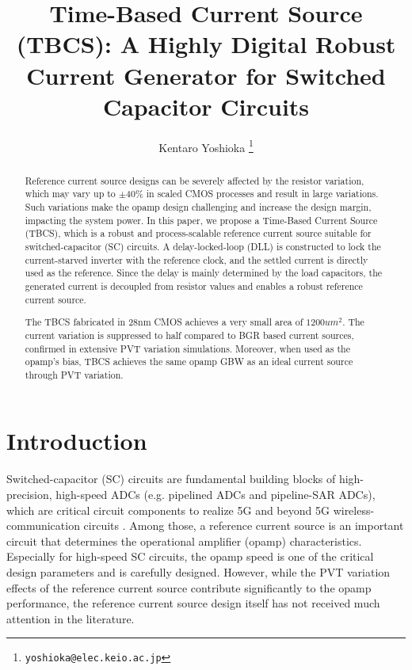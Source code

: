 \documentclass[letterpaper, 10 pt, conference]{ieeeconf}  %
\title{\LARGE \bf
Time-Based Current Source (TBCS): A Highly Digital Robust Current Generator for Switched Capacitor Circuits
}
\author{Kentaro Yoshioka%
\thanks{
        {\tt\small yoshioka@elec.keio.ac.jp}}
}
\begin{document}
\maketitle
\thispagestyle{empty}
\pagestyle{empty}

\begin{abstract}

Reference current source designs can be severely affected by the resistor variation, which may vary up to $\pm$40\% in scaled CMOS processes and result in large variations. Such variations make the opamp design challenging and increase the design margin, impacting the system power.
In this paper, we propose a Time-Based Current Source (TBCS), which is a robust and process-scalable reference current source suitable for switched-capacitor (SC) circuits.
A delay-locked-loop (DLL) is constructed to lock the current-starved inverter with the reference clock, and the settled current is directly used as the reference.
Since the delay is mainly determined by the load capacitors, the generated current is decoupled from resistor values and enables a robust reference current source. 

The TBCS fabricated in 28nm CMOS achieves a very small area of $1200um^2$. The current variation is suppressed to half compared to BGR based current sources, confirmed in extensive PVT variation simulations. Moreover, when used as the opamp's bias, TBCS achieves the same opamp GBW as an ideal current source through PVT variation.

\end{abstract}

\section{Introduction}

Switched-capacitor (SC) circuits are fundamental building blocks of high-precision, high-speed ADCs (e.g. pipelined ADCs and pipeline-SAR ADCs), which are critical circuit components to realize 5G and beyond 5G wireless-communication circuits \cite{5g1, 5g2, ali201414, ali202012, lagos2018single, hung2020calibration}. Among those, a reference current source is an important circuit that determines the operational amplifier (opamp) characteristics. Especially for high-speed SC circuits, the opamp speed is one of the critical design parameters and is carefully designed. However, while the PVT variation effects of the reference current source contribute significantly to the opamp performance, the reference current source design itself has not received much attention in the literature.
\end{document}
